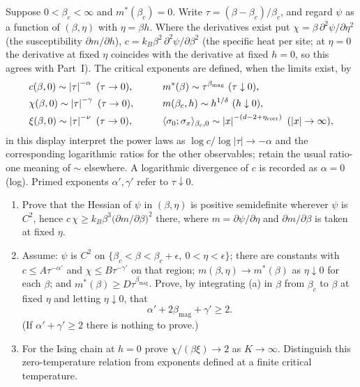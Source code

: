 \begin{exercise}
Suppose $0<\beta_c<\infty$ and $m^*(\beta_c)=0$.  Write $\tau=(\beta-\beta_c)/\beta_c$, and
regard $\psi$ as a function of $(\beta,\eta)$ with $\eta=\beta h$.  Where the
derivatives exist put $\chi=\beta\,\partial^2\psi/\partial\eta^2$
(the susceptibility $\partial m/\partial h$), $c=k_B\beta^2\,\partial^2\psi/\partial\beta^2$
(the specific heat per site; at $\eta=0$ the derivative at fixed $\eta$
coincides with the derivative at fixed $h=0$, so this agrees with Part~I).
The critical exponents are defined, when the limits exist, by
\begin{alignat*}{2}
 &c(\beta,0)\sim\left\lvert \tau\right\rvert^{-\alpha}\ (\tau\to0),&\qquad
 &m^*(\beta)\sim\tau^{\beta_{\mathrm{mag}}}\ (\tau\downarrow0),\\
 &\chi(\beta,0)\sim\left\lvert \tau\right\rvert^{-\gamma}\ (\tau\to0),&
 &m(\beta_c,h)\sim h^{1/\delta}\ (h\downarrow0),\\
 &\xi(\beta,0)\sim\left\lvert \tau\right\rvert^{-\nu}\ (\tau\to0),&
 &\langle\sigma_0;\sigma_x\rangle_{\beta_c,0}\sim\left\lvert x\right\rvert^{-(d-2+\eta_{\mathrm{corr}})}\ (\left\lvert x\right\rvert\to\infty),
\end{alignat*}
in this display interpret the power laws as
$\log c/\log|\tau|\to-\alpha$ and the corresponding logarithmic
ratios for the other observables; retain the usual ratio-one
meaning of $\sim$ elsewhere. A logarithmic divergence of $c$ is
recorded as $\alpha=0$ (log).  Primed exponents $\alpha',\gamma'$ refer to
$\tau\downarrow0$.
\begin{enumerate}[label=(\alph*)]
\item Prove that the Hessian of $\psi$ in $(\beta,\eta)$ is positive
semidefinite wherever $\psi$ is $C^2$, hence
$c\,\chi\ge k_B\beta^3\bigl(\partial m/\partial\beta\bigr)^2$ there, where
$m=\partial\psi/\partial\eta$ and $\partial m/\partial\beta$ is taken at fixed $\eta$.
\item Assume: $\psi$ is $C^2$ on $\{\beta_c<\beta<\beta_c+\epsilon,\ 0<\eta<\epsilon\}$;
there are constants with $c\le A\tau^{-\alpha'}$ and
$\chi\le B\tau^{-\gamma'}$ on that region; $m(\beta,\eta)\to m^*(\beta)$ as
$\eta\downarrow0$ for each $\beta$; and $m^*(\beta)\ge D\tau^{\beta_{\mathrm{mag}}}$.
Prove, by integrating (a) in $\beta$ from $\beta_c$ to $\beta$ at fixed $\eta$ and
letting $\eta\downarrow0$, that
\[
 \alpha'+2\beta_{\mathrm{mag}}+\gamma'\ge2 .
\]
(If $\alpha'+\gamma'\ge2$ there is nothing to prove.)
\item For the Ising chain at $h=0$ prove
$\chi/(\beta\xi)\to2$ as $K\to\infty$.
Distinguish this zero-temperature relation from exponents
defined at a finite critical temperature.
\end{enumerate}
\end{exercise}

